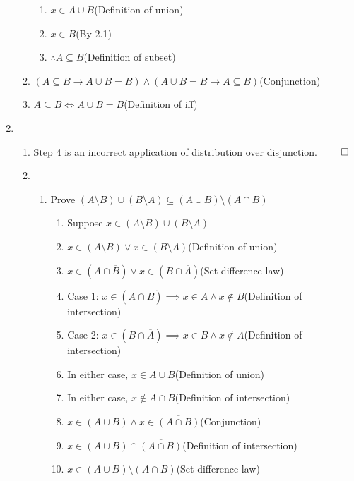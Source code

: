 \documentclass[12pt, a4paper]{article}
\begin{document}
\begin{enumerate}[Q\arabic*.]
\begin{enumerate}[\arabic*.]
\begin{enumerate}[label=2.\arabic*]
          \item $x\in A \cup B$\hfill(Definition of union)
          \item $x \in B$\hfill(By 2.1)
          \item $\therefore A \subseteq B$\hfill(Definition of subset)
        \end{enumerate}
      \item $(A \subseteq B \rightarrow A \cup B = B) \land (A \cup B = B \rightarrow A \subseteq B)$\hfill(Conjunction)
      \item $A \subseteq B \iff A \cup B = B$\hfill(Definition of iff)
    \end{enumerate}

  \pagebreak
  \item 
    \begin{enumerate}[(\alph*)]
      \item Step 4 is an incorrect application of distribution over disjunction. $\qed$
      \item 
        \begin{enumerate}[\arabic*.]
          \item Prove $(A \setminus B) \cup (B \setminus A) \subseteq (A \cup B) \setminus (A \cap B)$
          \begin{enumerate}[label=1.\arabic*]
            \item Suppose $x \in (A \setminus B) \cup (B \setminus A)$
            \item $x \in (A \setminus B) \lor x\in(B \setminus A)$\hfill(Definition of union)
            \item $x \in (A \cap \overline{B}) \lor x\in(B \cap \overline{A})$\hfill(Set difference law)
            \item Case 1: $x \in (A \cap \overline{B}) \implies x \in A \land x \not\in B$\hfill(Definition of intersection)
            \item Case 2: $x \in (B \cap \overline{A}) \implies x \in B \land x \not\in A$\hfill(Definition of intersection)
            \item In either case, $x \in A \cup B$\hfill(Definition of union)
            \item In either case, $x \not\in A \cap B$\hfill(Definition of intersection)
            \item $x \in (A \cup B) \land x \in \overline{(A \cap B)}$\hfill(Conjunction)
            \item $x \in (A \cup B) \cap \overline{(A \cap B)}$\hfill(Definition of intersection)
            \item $x \in (A \cup B) \setminus (A \cap B)$\hfill(Set difference law)

\end{enumerate}
\end{enumerate}
\end{enumerate}
\end{enumerate}
\end{document}
